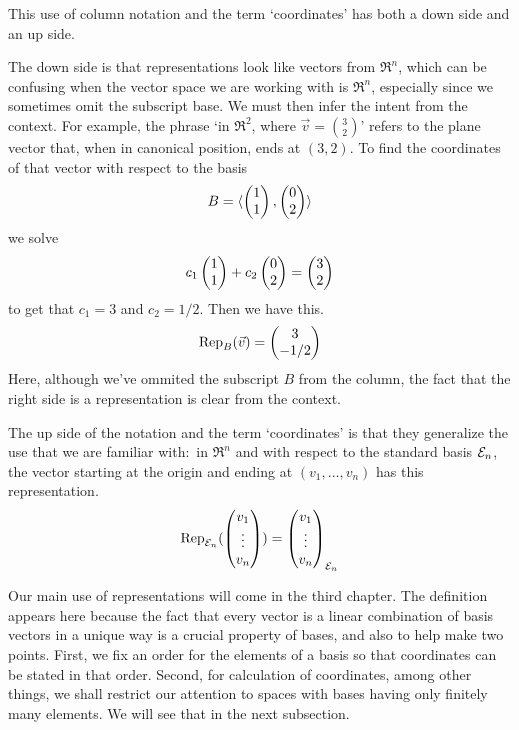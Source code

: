 \begin{remark}
This use of column notation and the term `coordinates' has both a down side
and an up side.

The down side is that 
representations look like vectors from \( \Re^n \), which can be
confusing when the vector space we are working with is $\Re^n$, 
especially since we sometimes omit the subscript base.
We must then infer the intent from the context.
For example, the phrase `in \( \Re^2 \), where $\vec{v}=\binom{3}{2}$'
refers to the plane vector that, when in canonical position, ends at
\( (3,2) \).
To find the coordinates of that vector with respect to the basis
\begin{equation*}
  B=\sequence{
              \colvec{1 \\ 1},
              \colvec{0 \\ 2} }
\end{equation*}
we solve
\begin{equation*}
  c_1\colvec{1 \\ 1}
  +c_2\colvec{0 \\ 2}
  =
  \colvec{3 \\ 2}
\end{equation*}
to get that $c_1=3$ and $c_2=1/2$.
Then we have this.
\begin{equation*}
  \rep{\vec{v}}{B}=\colvec{3 \\ -1/2}
\end{equation*}
Here, although we've ommited the subscript \( B \) from the column, 
the fact that the right side is a representation is clear from the context.

The up side of the notation and the term `coordinates' is that they
generalize the use that we are familiar with:~in \( \Re^n \) 
and with respect to the standard
basis \( \stdbasis_n \), the vector starting at the origin and ending at
\( (v_1,\dots,v_n) \) has this representation.
\begin{equation*}
  \rep{\colvec{v_1 \\ \vdots \\ v_n}}{\stdbasis_n}
    =
  \colvec{v_1 \\ \vdots \\ v_n}_{\stdbasis_n}
\end{equation*}
\end{remark}

Our main use of representations will come in the third chapter.
The definition appears here because the fact that every vector is a linear
combination of basis vectors in a unique way is a crucial property of bases,
and also to help make two points.
First, we fix an order for the elements of a basis
so that coordinates can be stated in that order.
Second, for calculation of coordinates, among other things, we shall
restrict our attention to spaces with bases having only finitely many elements.
We will see that in the next subsection.

